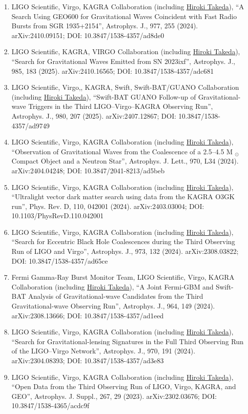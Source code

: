 \documentclass[uplatex, 11pt]{jsarticle}
\begin{document}
\begin{enumerate}
\item LIGO Scientific, Virgo, KAGRA Collaboration (including \uline{Hiroki Takeda}), “A Search Using GEO600 for Gravitational Waves Coincident with Fast Radio Bursts from SGR 1935+2154”, Astrophys. J., 977, 255 (2024). arXiv:2410.09151; DOI: 10.3847/1538-4357/ad8de0
\item LIGO Scientific, KAGRA, VIRGO Collaboration (including \uline{Hiroki Takeda}), “Search for Gravitational Waves Emitted from SN 2023ixf”, Astrophys. J., 985, 183 (2025). arXiv:2410.16565; DOI: 10.3847/1538-4357/adc681
\item LIGO Scientific, Virgo,, KAGRA, Swift, Swift-BAT/GUANO Collaboration (including \uline{Hiroki Takeda}), “Swift-BAT GUANO Follow-up of Gravitational-wave Triggers in the Third LIGO–Virgo–KAGRA Observing Run”, Astrophys. J., 980, 207 (2025). arXiv:2407.12867; DOI: 10.3847/1538-4357/ad9749
\item LIGO Scientific, Virgo, KAGRA Collaboration (including \uline{Hiroki Takeda}), “Observation of Gravitational Waves from the Coalescence of a 2.5–4.5 M $_⊙$ Compact Object and a Neutron Star”, Astrophys. J. Lett., 970, L34 (2024). arXiv:2404.04248; DOI: 10.3847/2041-8213/ad5beb
\item LIGO Scientific, Virgo, KAGRA Collaboration (including \uline{Hiroki Takeda}), “Ultralight vector dark matter search using data from the KAGRA O3GK run”, Phys. Rev. D, 110, 042001 (2024). arXiv:2403.03004; DOI: 10.1103/PhysRevD.110.042001
\item LIGO Scientific, Virgo, KAGRA Collaboration (including \uline{Hiroki Takeda}), “Search for Eccentric Black Hole Coalescences during the Third Observing Run of LIGO and Virgo”, Astrophys. J., 973, 132 (2024). arXiv:2308.03822; DOI: 10.3847/1538-4357/ad65ce
\item Fermi Gamma-Ray Burst Monitor Team, LIGO Scientific, Virgo, KAGRA Collaboration (including \uline{Hiroki Takeda}), “A Joint Fermi-GBM and Swift-BAT Analysis of Gravitational-wave Candidates from the Third Gravitational-wave Observing Run”, Astrophys. J., 964, 149 (2024). arXiv:2308.13666; DOI: 10.3847/1538-4357/ad1eed
\item LIGO Scientific, Virgo, KAGRA Collaboration (including \uline{Hiroki Takeda}), “Search for Gravitational-lensing Signatures in the Full Third Observing Run of the LIGO–Virgo Network”, Astrophys. J., 970, 191 (2024). arXiv:2304.08393; DOI: 10.3847/1538-4357/ad3e83
\item LIGO Scientific, Virgo, KAGRA Collaboration (including \uline{Hiroki Takeda}), “Open Data from the Third Observing Run of LIGO, Virgo, KAGRA, and GEO”, Astrophys. J. Suppl., 267, 29 (2023). arXiv:2302.03676; DOI: 10.3847/1538-4365/acdc9f

\end{enumerate}
\end{document}
